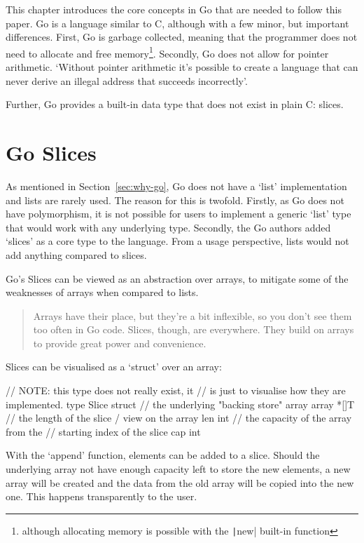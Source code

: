This chapter introduces the core concepts in Go that are needed to follow this paper.
Go is a language similar to C, although with a few minor, but important differences.
First, Go is garbage collected, meaning that the programmer does not need to allocate
and free memory\footnote{although allocating memory is possible with the \texttt|new|
built-in function}. Secondly, Go does not allow for pointer arithmetic.
`Without pointer arithmetic it's possible to create a language that can never derive an
illegal address that succeeds incorrectly'\autocite{go-pointerarithmetic}.

Further, Go provides a built-in data type that does not exist in plain C: slices.

\section{Go Slices}\label{sec:go-slices}

As mentioned in Section~\ref{sec:why-go}, Go does not have a `list' implementation and lists are rarely used.
The reason for this
is twofold. Firstly, as Go does not have polymorphism, it is not possible for users to implement a generic
`list' type that would work with any underlying type. Secondly, the Go authors added `slices' as a core type
to the language. From a usage perspective, lists would not add anything compared to slices.

Go's Slices can be viewed as an abstraction over arrays, to mitigate some of the weaknesses of arrays
when compared to lists.

\begin{quote}
    Arrays have their place, but they're a bit inflexible, so you don't see them too often in Go code.
    Slices, though, are everywhere. They build on arrays to provide great power and convenience.\autocite{golang-slices}
\end{quote}

Slices can be visualised as a `struct' over an array:

\begin{gocode}
// NOTE: this type does not really exist, it
// is just to visualise how they are implemented.
type Slice struct {
    // the underlying "backing store" array
    array *[]T
    // the length of the slice / view on the array
    len int
    // the capacity of the array from the
    // starting index of the slice
    cap int
}
\end{gocode}

With the `append' function, elements can be added to a slice. Should the underlying array not have enough
capacity left to store the new elements, a new array will be created and the data from the old array will
be copied into the new one. This happens transparently to the user.

